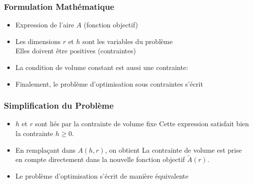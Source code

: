 \documentclass[9pt,table]{beamer} %
\begin{document}
\begin{frame}
\frametitle{Formulation Mathématique}

\begin{itemize}[label=\tiny$\blacksquare$]
	\item Expression de l'aire $A$ (\alert{fonction objectif})
	
	
	
	\item Les dimensions $r$ et $h$ sont les \alert{variables} du problème \\ Elles doivent être positives (\alert{contraintes})
	
	
	
	\item La condition de volume constant est aussi une \alert{contrainte}: 



	\item Finalement, le \alert{problème d'optimisation sous contraintes} s'écrit
\end{itemize}

\end{frame}







\begin{frame}
\frametitle{Simplification du Problème}

\begin{itemize}[label=\tiny$\blacksquare$]
	\item $h$ et $r$ sont liés par la contrainte de volume fixe
	Cette expression satisfait bien la contrainte $h \geq 0$.
	\item En remplaçant dans $A(h,r)$, on obtient
	La contrainte de volume est prise en compte directement dans la nouvelle fonction objectif $\tilde{A}(r)$.
	
	\item Le problème d'optimisation s'écrit de manière équivalente
\end{itemize}
\end{frame}
\end{document}
